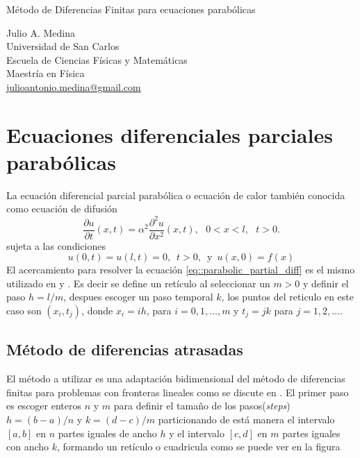 \documentclass[a4paper]{article}
\begin{document}

\Large
 \begin{center}
Método de Diferencias Finitas para ecuaciones parabólicas\\


\hspace{10pt}

\large
Julio A. Medina\\
\hspace{10pt}
\small  
Universidad de San Carlos\\
Escuela de Ciencias Físicas y Matemáticas\\
Maestría en Física\\
\href{mailto:julioantonio.medina@gmail.com}{julioantonio.medina@gmail.com}\\

\end{center}

\hspace{10pt}

\normalsize
\section{Ecuaciones diferenciales parciales parabólicas}
La ecuación diferencial parcial parabólica o ecuación de calor también conocida como ecuación de difusión
\begin{equation}\label{eq::parabolic_partial_diff}
\frac{\partial u}{\partial t}(x,t) = \alpha^2 \frac{\partial^2 u}{\partial x^2}(x,t),\,\,\,\, 0<x<l, \,\,\,\, t>0.
\end{equation}
sujeta a las condiciones
\begin{equation}
u(0,t)=u(l,t)=0,\,\,\, t>0, \,\,\,\text{y}\,\,\, u(x,0)=f(x)
\end{equation}
El acercamiento para resolver la ecuación \ref{eq::parabolic_partial_diff} es el mismo utilizado en \cite{Medina} y \cite{Burden}. Es decir se define un retículo al seleccionar un $m>0$ y definir el paso $h=l/m$, despues escoger un paso temporal $k$, los puntos del reticulo en este caso son $(x_i, t_j)$, donde $x_i=ih$, para $i=0,1,\hdots,m$ y $t_j=jk$ para $j=1,2,\hdots$. 
\subsection{Método de diferencias atrasadas}
El método a utilizar es una adaptación bidimensional del método de diferencias finitas para problemas con fronteras lineales como se discute en \cite{Burden}. El primer paso es escoger enteros $n$ y $m$ para definir el tamaño de los pasos(\textit{steps}) $h=(b-a)/n$ y $k=(d-c)/m$ particionando de está manera el intervalo $[a,b]$ en $n$ partes iguales de ancho $h$ y el intervalo $[c,d]$ en $m$ partes iguales con ancho $k$, formando un retículo o cuadricula como se puede ver en la figura
\end{document}

